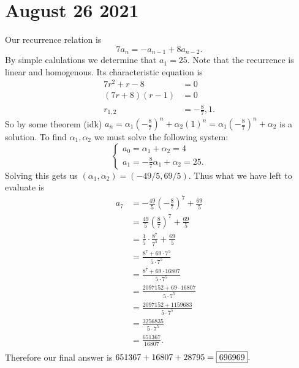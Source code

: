 \documentclass[letterpaper,oneside]{book}
\begin{document}
\section*{August 26 2021}
Our recurrence relation is
$$7a_{n}=-a_{n-1}+8a_{n-2}.$$
By simple calulations we determine that $a_1=25.$
Note that the recurrence is linear and homogenous. Its characteristic equation is
\begin{align*}
    7r^2+r-8    & =0                \\
    (7r+8)(r-1) & =0                \\
    r_{1,2}     & = -\frac{8}{7},1.
\end{align*}
So by some theorem (idk) $a_n=\alpha_1\left(-\frac{8}{7}\right)^n+\alpha_2(1)^n=\alpha_1\left(-\frac{8}{7}\right)^n+\alpha_2$ is a solution. To find $\alpha_1,\alpha_2$ we must solve the following system:
$$
    \begin{cases}
        a_0 = \alpha_1+\alpha_2=4 \\
        a_1 = -\frac{8}{7}\alpha_1+\alpha_2=25.
    \end{cases}
$$ Solving this gets us $(\alpha_1,\alpha_2) = (-49/5, 69/5).$ Thus what we have left to evaluate is
\begin{align*}
    a_7 & = -\frac{49}{5}\left(-\frac{8}{7}\right)^7+\frac{69}{5} \\
    & = \frac{49}{5}\left(\frac{8}{7}\right)^7+\frac{69}{5} \\
    & = \frac{1}{5}\cdot\frac{8^7}{7^5}+\frac{69}{5} \\
    & = \frac{8^7+69\cdot7^5}{5\cdot7^5}\\
    & = \frac{8^7+69\cdot16807}{5\cdot7^5}\\
    & = \frac{2097152+69\cdot16807}{5\cdot7^5}\\
    & = \frac{2097152+1159683}{5\cdot7^5}\\
    & = \frac{3256835}{5\cdot7^5}\\
    & = \frac{651367}{16807}.\\
\end{align*}
Therefore our final answer is $651367+16807+28795=\fbox{696969}.$
\end{document}
